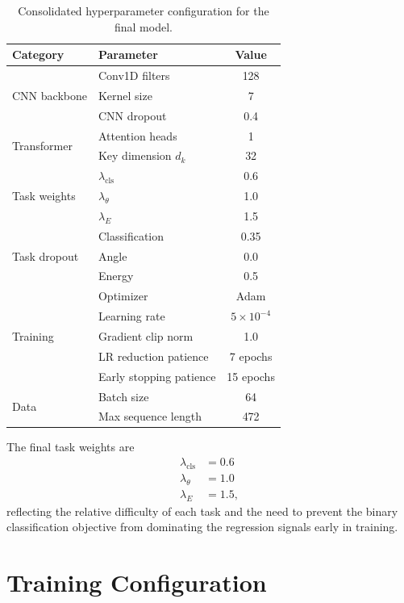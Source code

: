 \begin{table}[htbp]
\centering
\caption[Consolidated hyperparameter configuration.]{Consolidated hyperparameter configuration for the final model.}
\label{tab:hyperparameters}
\footnotesize
\setlength{\tabcolsep}{7pt}
\renewcommand{\arraystretch}{1.1}
\begin{tabular}{llc}
\toprule
\textbf{Category} & \textbf{Parameter} & \textbf{Value} \\
\midrule
\multirow{3}{*}{CNN backbone}
  & Conv1D filters & 128 \\
  & Kernel size & 7 \\
  & CNN dropout & 0.4 \\
\midrule
\multirow{2}{*}{Transformer}
  & Attention heads & 1 \\
  & Key dimension $d_k$ & 32 \\
\midrule
\multirow{3}{*}{Task weights}
  & $\lambda_\text{cls}$ & 0.6 \\
  & $\lambda_\theta$ & 1.0 \\
  & $\lambda_E$ & 1.5 \\
\midrule
\multirow{3}{*}{Task dropout}
  & Classification & 0.35 \\
  & Angle & 0.0 \\
  & Energy & 0.5 \\
\midrule
\multirow{5}{*}{Training}
  & Optimizer & Adam \\
  & Learning rate & $5 \times 10^{-4}$ \\
  & Gradient clip norm & 1.0 \\
  & LR reduction patience & 7 epochs \\
  & Early stopping patience & 15 epochs \\
\midrule
\multirow{2}{*}{Data}
  & Batch size & 64 \\
  & Max sequence length & 472 \\
\bottomrule
\end{tabular}
\end{table}

The final task weights are
\begin{align*}
    \lambda_\text{cls} &= 0.6 \\
    \lambda_\theta &= 1.0 \\
    \lambda_E &= 1.5 ,
\end{align*}
reflecting the relative difficulty of each task and the need to prevent the binary classification objective from dominating the regression signals early in training.

\section{Training Configuration}

